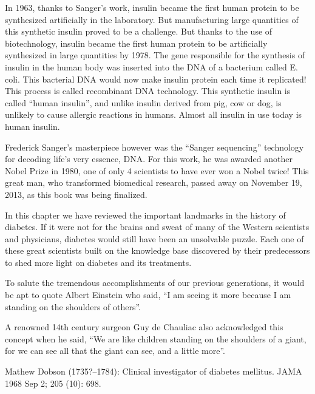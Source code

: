 In 1963, thanks to Sanger’s work, insulin became the first human protein to be synthesized artificially in the laboratory. But manu\-factu\-ring large quantities of this synthetic insulin proved to be a challenge. But thanks to the use of biotechnology, insulin became the first human protein to be artificially synthesized in large quantities by 1978. The gene responsible for the synthesis of insulin in the human body was inserted into the DNA of a ba\-cterium called E. coli. This bacterial DNA would now make insulin protein each time it replicated! This process is called recombinant DNA technology. This synthetic insu\-lin is called “human insulin”, and unlike insulin derived from pig, cow or dog, is unlikely to cause allergic reactions in humans. Almost all insu\-lin in use today is human insulin.

\clearpage

Frederick Sanger’s masterpiece however was the “Sanger seque\-ncing” technology for decoding life’s very essence, DNA. For this work, he was awarded another Nobel Prize in 1980, one of only 4 scientists to have ever won a Nobel twice! This great man, who transformed biomedical research, passed away on Nove\-mber 19, 2013, as this book was being finalized.

In this chapter we have reviewed the important landmarks in the history of diabetes. If it were not for the brains and sweat of many of the Western scientists and physicians, diabetes would still have been an unsolvable puzzle. Each one of these great scientists built on the knowledge base discovered by their predecessors to shed more light on diabetes and its treatments.

To salute the tremendous accomplishments of our previous genera\-tions, it would be apt to quote Albert Einstein who said, “I am seeing it more because I am standing on the shoulders of others”.

A renowned 14th century surgeon Guy de Chauliac also acknow\-ledged this concept when he said, “We are like children standing on the shoulders of a giant, for we can see all that the giant can see, and a little more”.

\begin{thebibliography}{99}
 Mathew Dobson (1735?–1784): Clinical investigator of diabetes mellitus. JAMA 1968 Sep 2; 205 (10): 698.
\end{thebibliography}

\newpage

